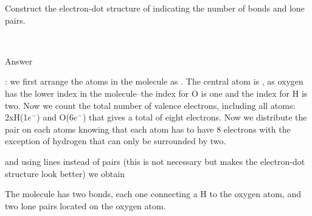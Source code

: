 \documentclass[main.tex]{subfiles}
\begin{document}
\begin{example}{}
\begin{it} 
Construct the electron-dot structure of  indicating the number of bonds and lone pairs.
\end{it}\\
\Sepline
\begin{bf}Answer\end{bf}: we first arrange the atoms in the molecule as \hspace{.05in}\hspace{.05in}. The central atom is , as oxygen has the lower index in the  molecule--the index for O is one and the index for H is two. Now we count the total number of valence electrons, including all atoms: 2xH(1$e^-$) and O(6$e^-$) that gives a total of eight electrons. Now we distribute the pair on each atoms knowing that each atom has to have 8 electrons with the exception of hydrogen that can only be surrounded by two.
\begin{center}\hspace{.05in}\hspace{.05in}\hspace{.05in}\end{center} 
and using lines instead of pairs (this is not necessary but makes the electron-dot structure look better) we obtain
\begin{center}\hspace{.05in} \end{center}
The molecule has two bonds, each one connecting a H to the oxygen atom, and two lone pairs located on the oxygen atom.
\end{example}
\end{document}
